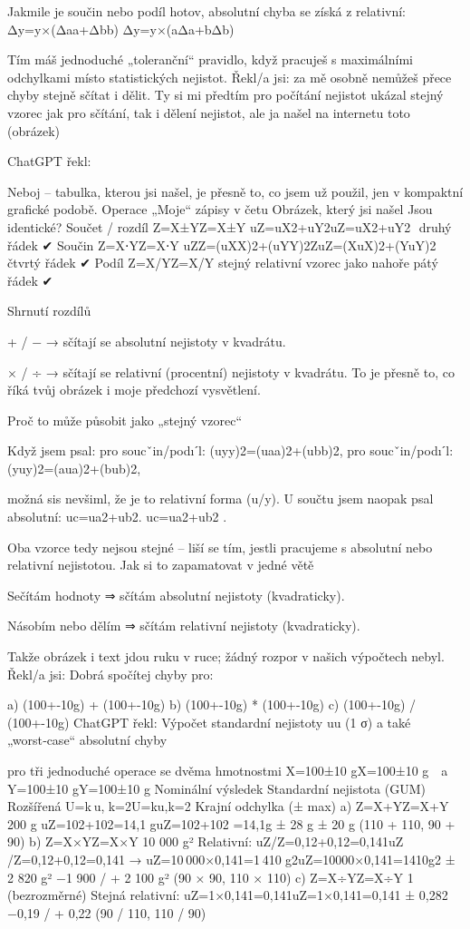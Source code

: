 {Jakmile je součin nebo podíl hotov, absolutní chyba se získá z relativní:
Δy=y×(Δaa+Δbb)
Δy=y×(aΔa​+bΔb​)

Tím máš jednoduché „toleranční“ pravidlo, když pracuješ s maximálními odchylkami místo statistických nejistot.
Řekl/a jsi:
za mě osobně nemůžeš přece chyby stejně sčítat i dělit. Ty si mi předtím pro počítání nejistot ukázal stejný vzorec jak pro sčítání, tak i dělení nejistot, ale ja našel na internetu toto (obrázek)

ChatGPT řekl:

Neboj – tabulka, kterou jsi našel, je přesně to, co jsem už použil, jen v kompaktní grafické podobě.
Operace	„Moje“ zápisy v četu	Obrázek, který jsi našel	Jsou identické?
Součet / rozdíl Z=X±YZ=X±Y	uZ=uX2+uY2uZ​=uX2​+uY2​
​	druhý řádek	✔
Součin Z=X⋅YZ=X⋅Y	uZZ=(uXX)2+(uYY)2ZuZ​​=(XuX​​)2+(YuY​​)2
​	čtvrtý řádek	✔
Podíl Z=X/YZ=X/Y	stejný relativní vzorec jako nahoře	pátý řádek	✔

    Shrnutí rozdílů

        + / − → sčítají se absolutní nejistoty v kvadrátu.

        × / ÷ → sčítají se relativní (procentní) nejistoty v kvadrátu.
        To je přesně to, co říká tvůj obrázek i moje předchozí vysvětlení.

Proč to může působit jako „stejný vzorec“

Když jsem psal:
pro soucˇin/podıˊl: (uyy)2=(uaa)2+(ubb)2,
pro soucˇin/podıˊl: (yuy​​)2=(aua​​)2+(bub​​)2,

možná sis nevšiml, že je to relativní forma (u/y). U součtu jsem naopak psal absolutní:
uc=ua2+ub2.
uc​=ua2​+ub2​
​.

Oba vzorce tedy nejsou stejné – liší se tím, jestli pracujeme s absolutní nebo relativní nejistotou.
Jak si to zapamatovat v jedné větě

    Sečítám hodnoty ⇒ sčítám absolutní nejistoty (kvadraticky).

    Násobím nebo dělím ⇒ sčítám relativní nejistoty (kvadraticky).

Takže obrázek i text jdou ruku v ruce; žádný rozpor v našich výpočtech nebyl.
Řekl/a jsi:
Dobrá spočítej chyby pro:

a) (100+-10g) + (100+-10g)
b) (100+-10g) * (100+-10g)
c) (100+-10g) / (100+-10g)
ChatGPT řekl:
Výpočet standardní nejistoty uu (1 σ) a také „worst‑case“ absolutní chyby

pro tři jednoduché operace se dvěma hmotnostmi
X=100±10 gX=100±10 g a Y=100±10 gY=100±10 g
	Nominální výsledek	Standardní nejistota (GUM)	Rozšířená U=k u,  k=2U=ku,k=2	Krajní odchylka (± max)
a) Z=X+YZ=X+Y	200 g	uZ=102+102=14,1  guZ​=102+102
​=14,1g	± 28 g	± 20 g (110 + 110, 90 + 90)
b) Z=X×YZ=X×Y	10 000 g²	Relativní: uZ/Z=0,12+0,12=0,141uZ​/Z=0,12+0,12
​=0,141 → uZ=10 000×0,141=1 410  g2uZ​=10000×0,141=1410g2	± 2 820 g²	−1 900 / + 2 100 g² (90 × 90, 110 × 110)
c) Z=X÷YZ=X÷Y	1 (bezrozměrné)	Stejná relativní: uZ=1×0,141=0,141uZ​=1×0,141=0,141	± 0,282	−0,19 / + 0,22 (90 / 110, 110 / 90)

}
